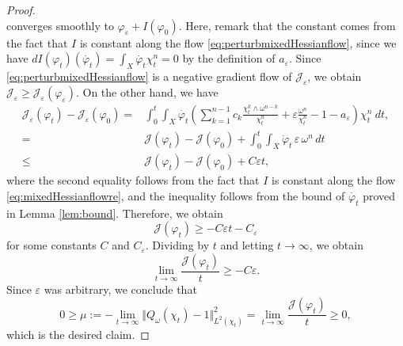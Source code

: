 \documentclass{amsart}
\numberwithin{equation}{section}
\theoremstyle{plain}
\theoremstyle{definition}
\theoremstyle{remark}
\begin{document}
\begin{proof}
\begin{equation}
\end{equation}
    converges smoothly to $\varphi_\varepsilon+I(\varphi_0)$. Here, remark that the constant comes from the fact that $I$ is constant along the flow \eqref{eq:perturbmixedHessianflow}, since we have
    $dI(\varphi_t)(\dot{\varphi_t})=\int_X\dot{\varphi_t}\chi_t^n=0$
    by the definition of $a_\varepsilon$.
    Since \eqref{eq:perturbmixedHessianflow} is a negative gradient flow of $\mathcal{J}_{\varepsilon}$, we obtain $\mathcal{J}_{\varepsilon}\ge\mathcal{J}_{\varepsilon}(\varphi_\varepsilon).$ 
    On the other hand, we have
    \begin{equation*}
        \begin{aligned}
            \mathcal{J}_{\varepsilon}(\varphi_t)-\mathcal{J}_{\varepsilon}(\varphi_0)
            =&\int_0^t\int_X\dot{\varphi_t}\left(\sum_{k=1}^{n-1}c_k\frac{\chi_t^k\wedge\omega^{n-k}}{\chi_t^n}+\varepsilon\frac{\omega^n}{\chi_t^n}-1-a_{\varepsilon}\right)\chi_t^n\ dt,\\
            =&\mathcal{J}(\varphi_t)-\mathcal{J}(\varphi_0)+\int_0^t\int_X\dot{\varphi}_t\, \varepsilon\, \omega^n \,dt\\
            \le&\mathcal{J}(\varphi_t)-\mathcal{J}(\varphi_0)+C\varepsilon t,
        \end{aligned}
    \end{equation*}
    where the second equality follows from the fact that $I$ is constant along the flow \eqref{eq:mixedHessianflowre}, and the inequality follows from the bound of $\dot{\varphi_t}$ proved in Lemma \ref{lem:bound}. Therefore, we obtain
    $$\mathcal{J}(\varphi_t)\ge -C\varepsilon t-C_\varepsilon$$
    for some constants $C$ and $C_\varepsilon$.
    Dividing by $t$ and letting $t\to\infty$, we obtain
    $$\lim_{t\to\infty}\frac{\mathcal{J}(\varphi_t)}{t}\ge -C\varepsilon.$$
    Since $\varepsilon$ was arbitrary, we conclude that
    $$0\ge\mu:=-\lim_{t\to\infty}\Vert Q_{\omega}(\chi_t)-1\Vert^2_{L^2(\chi_t)}=\lim_{t\to\infty}\frac{\mathcal{J}(\varphi_t)}{t}\ge0,$$
    which is the desired claim.
\end{proof}
\end{document}
